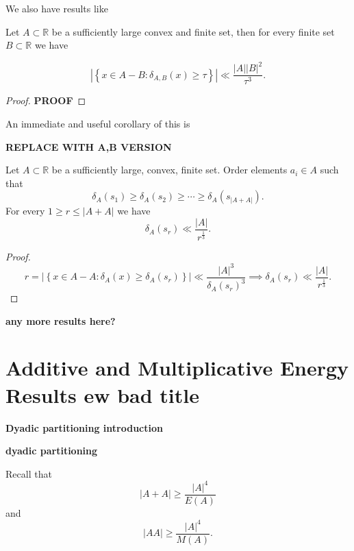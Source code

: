 \documentclass[12pt]{amsart}
\begin{document}
We also have results like

\begin{theorem}

    Let \(A \subset \mathbb{R} \) be a sufficiently large convex and finite set, then for every 
    finite set \(B \subset \mathbb{R} \) we have

    \[
        \left\lvert \left\{ x \in A-B : \delta_{A,B} (x) \geq \tau \right\}  \right\rvert \ll \frac{\left\lvert A \right\rvert \left\lvert B \right\rvert^{2} }{\tau^{3} }
    .\]
\end{theorem}

\begin{proof}
\textbf{PROOF}
\end{proof}

An immediate and useful corollary of this is

\textbf{REPLACE WITH A,B VERSION}

\begin{corollary}
Let \(A \subset \mathbb{R} \) be a sufficiently large, convex, finite set.
Order elements \(a_{i} \in A\) such that 
\[
    \delta_{A} (s_1) \geq \delta_{A} (s_2) \geq \cdots \geq \delta_{A} (s _{\left\lvert A+A \right\rvert } )
.\]
For every \(1 \geq r \leq \left\lvert A+A \right\rvert\) we have
\[
    \delta_{A} (s _{r} ) \ll \frac{\left\lvert A \right\rvert }{r^{\frac{1}{3} }}
.\]
\end{corollary}

\begin{proof}
\[
    r = \left\lvert \left\{ x \in A-A : \delta _{A} (x) \geq \delta_{A} (s _{r} ) \right\}  \right\rvert \ll \frac{\left\lvert A \right\rvert ^{3} }{\delta_{A} (s _{r} )^{3} } \implies \delta_{A} (s _{r} ) \ll \frac{\left\lvert A \right\rvert }{r^{\frac{1}{3} }}
.\]
\end{proof}

\textbf{any more results here?}

\section{Additive and Multiplicative Energy Results \textbf{ew bad title} }

\textbf{Dyadic partitioning introduction}

\begin{lemma}
\textbf{dyadic partitioning}
\end{lemma}

Recall that
\[
    \left\lvert A + A \right\rvert \geq  \frac{\left\lvert A \right\rvert ^{4}}{ E(A) }
\]
and
\[
    \left\lvert AA \right\rvert \geq \frac{\left\lvert A \right\rvert ^{4}}{M(A) }
.\]
\end{document}
